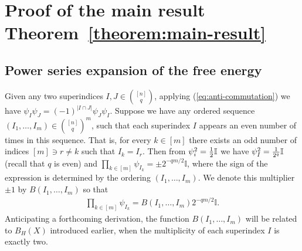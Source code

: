 \documentclass[12pt]{article}
\newcommand{\id}{\mathbb{I}}
\begin{document}
\section{Proof of the main result Theorem~\ref{theorem:main-result}}\label{section:main-result}

\subsection{Power series expansion of the free energy}
Given any two superindices $I,J\in\binom{[n]}{q}$, applying (\ref{eq:anti-commutation}) we have  $\psi_I\psi_J=(-1)^{|I \cap J|}\psi_J\psi_I$.
Suppose we have any ordered sequence $(I_1,\ldots,I_m)\in \binom{[n]}{q}^m$, such that each superindex
$I$ appears an even number of times in this sequence. That is, for every $k\in [m]$ there exists an odd number of  indices $[m]\ni r\ne k$ such that $I_k=I_r$. Then
from $\psi_i^2={1\over 2}\id$ we have $\psi_I^2={1\over 2^q}\id$ (recall that $q$ is even) and 
$\prod_{k\in [m]} \psi_{I_k}=\pm 2^{-qm/2}\id$,
where the sign of the expression is determined by the ordering $(I_1,\ldots,I_m)$. We denote this multiplier $\pm 1$ by $B(I_1,\ldots,I_m)$ so that
\begin{align}
\prod_{k\in [m]} \psi_{I_k}= B(I_1,\ldots,I_m) 2^{-qm/2}\id. \label{eq:psi-product}
\end{align}
Anticipating a forthcoming derivation, the function $B(I_1,\ldots,I_m)$ will be related
to $B_H(X)$ introduced earlier, when the multiplicity of each superindex $I$ is exactly two.
\end{document}
